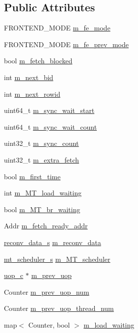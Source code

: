 \subsection*{Public Attributes}
\begin{DoxyCompactItemize}
\item 
FRONTEND\_\-MODE \hyperlink{structfrontend__s_adf08ea8a939c74abbd38f5b20f478afb}{m\_\-fe\_\-mode}
\item 
FRONTEND\_\-MODE \hyperlink{structfrontend__s_a47a245627b16da594ae17822dfba1fa3}{m\_\-fe\_\-prev\_\-mode}
\item 
bool \hyperlink{structfrontend__s_a552f1819ab43b5fa3388bc4f334954ce}{m\_\-fetch\_\-blocked}
\item 
int \hyperlink{structfrontend__s_a93d8c54a2f3e0a300bd658f6b1c4655a}{m\_\-next\_\-bid}
\item 
int \hyperlink{structfrontend__s_a7a185d5c19de542ec9e69cb19cc713a3}{m\_\-next\_\-rowid}
\item 
uint64\_\-t \hyperlink{structfrontend__s_a6f7aa38f4fe827d94f5aab6a201363ac}{m\_\-sync\_\-wait\_\-start}
\item 
uint64\_\-t \hyperlink{structfrontend__s_a35c7f50fd30081b6a017241177098407}{m\_\-sync\_\-wait\_\-count}
\item 
uint32\_\-t \hyperlink{structfrontend__s_afc743be3a1d726ca426c592a458fc29f}{m\_\-sync\_\-count}
\item 
uint32\_\-t \hyperlink{structfrontend__s_a3d10c239a82e97daca4ac26337055e85}{m\_\-extra\_\-fetch}
\item 
bool \hyperlink{structfrontend__s_aa6d2610315e51c45c127bed07a4d188d}{m\_\-first\_\-time}
\item 
int \hyperlink{structfrontend__s_ae06574214d7918161e7483fce9853330}{m\_\-MT\_\-load\_\-waiting}
\item 
bool \hyperlink{structfrontend__s_a6565486357402733c4b2c1486054551f}{m\_\-MT\_\-br\_\-waiting}
\item 
Addr \hyperlink{structfrontend__s_a10ac2fa31ffde8759fc710b754041e3e}{m\_\-fetch\_\-ready\_\-addr}
\item 
\hyperlink{structreconv__data__s}{reconv\_\-data\_\-s} \hyperlink{structfrontend__s_a8cff27ec3c03d739f4dccce4dcb31072}{m\_\-reconv\_\-data}
\item 
\hyperlink{structmt__scheduler__s}{mt\_\-scheduler\_\-s} \hyperlink{structfrontend__s_a448e3c3264b1dead315e8e1690405ecf}{m\_\-MT\_\-scheduler}
\item 
\hyperlink{classuop__c}{uop\_\-c} $\ast$ \hyperlink{structfrontend__s_a6c09302921435eaa8a904b258f8b351b}{m\_\-prev\_\-uop}
\item 
Counter \hyperlink{structfrontend__s_ae0b61c16c88f0061c2fc1c8c9db61709}{m\_\-prev\_\-uop\_\-num}
\item 
Counter \hyperlink{structfrontend__s_a4fec072ee6013132f739110f1928447c}{m\_\-prev\_\-uop\_\-thread\_\-num}
\item 
map$<$ Counter, bool $>$ \hyperlink{structfrontend__s_a01c6f3f474a3bc339d5b89bbb8a06096}{m\_\-load\_\-waiting}
\end{DoxyCompactItemize}



